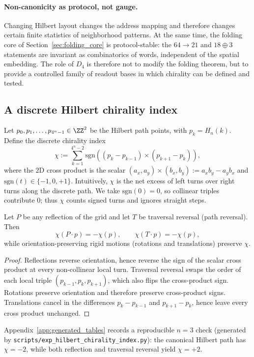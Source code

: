 \paragraph{Non-canonicity as protocol, not gauge.}
Changing Hilbert layout changes the address mapping and therefore changes certain finite statistics of neighborhood patterns.
At the same time, the folding core of Section~\ref{sec:folding_core} is protocol-stable: the $64\to 21$ and $18\oplus 3$ statements are invariant as combinatorics of words, independent of the spatial embedding.
The role of $D_4$ is therefore not to modify the folding theorem, but to provide a controlled family of readout bases in which chirality can be defined and tested.

\subsection{A discrete Hilbert chirality index}
\label{subsec:hilbert_chi}

Let $p_0,p_1,\dots,p_{4^n-1}\in\ZZ^2$ be the Hilbert path points, with $p_k=H_n(k)$.
Define the discrete chirality index
\begin{equation}\label{eq:hilbert_chi_def}
\chi:=\sum_{k=1}^{4^n-2}\mathrm{sgn}\!\left( (p_k-p_{k-1})\times (p_{k+1}-p_k)\right),
\end{equation}
where the $2$D cross product is the scalar $ (a_x,a_y)\times(b_x,b_y):=a_x b_y-a_y b_x$ and $\mathrm{sgn}(t)\in\{-1,0,+1\}$.
Intuitively, $\chi$ is the net excess of left turns over right turns along the discrete path.
We take $\mathrm{sgn}(0)=0$, so collinear triples contribute $0$; thus $\chi$ counts signed turns and ignores straight steps.

\begin{proposition}\label{prop:chi_flip}
Let $P$ be any reflection of the grid and let $T$ be traversal reversal (path reversal).
Then
\[
\chi(P\cdot p)=-\chi(p),\qquad
\chi(T\cdot p)=-\chi(p),
\]
while orientation-preserving rigid motions (rotations and translations) preserve $\chi$.
\end{proposition}
\begin{proof}
Reflections reverse orientation, hence reverse the sign of the scalar cross product at every non-collinear local turn.
Traversal reversal swaps the order of each local triple $(p_{k-1},p_k,p_{k+1})$, which also flips the cross-product sign.
Rotations preserve orientation and therefore preserve cross-product signs.
Translations cancel in the differences $p_k-p_{k-1}$ and $p_{k+1}-p_k$, hence leave every cross product unchanged.
\end{proof}

Appendix~\ref{app:generated_tables} records a reproducible $n=3$ check (generated by \texttt{scripts/exp\_hilbert\_chirality\_index.py}): the canonical Hilbert path has $\chi=-2$, while both reflection and traversal reversal yield $\chi=+2$.



